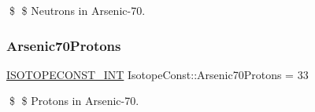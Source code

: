 \$ \$ Neutrons in Arsenic-\/70. \mbox{\label{group___isotope_const-_arsenic-_as70_ga6d9a28a8a7a5cb7e9d4cdf42d7f65a89}} 
\subsubsection{\texorpdfstring{Arsenic70\+Protons}{Arsenic70Protons}}
{\footnotesize\ttfamily \mbox{\hyperlink{group___isotope_const-_macros_ga5f18360b3e99483a35c32d789e62621c}{I\+S\+O\+T\+O\+P\+E\+C\+O\+N\+S\+T\+\_\+\+I\+NT}} Isotope\+Const\+::\+Arsenic70\+Protons = 33}

\$ \$ Protons in Arsenic-\/70. 